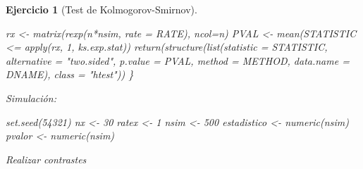 \documentclass[
  10pt,
]{book}
\newenvironment{Shaded}{\begin{snugshade}}{\end{snugshade}}
\newcommand{\AttributeTok}[1]{\textcolor[rgb]{0.77,0.63,0.00}{#1}}
\newcommand{\CommentTok}[1]{\textcolor[rgb]{0.56,0.35,0.01}{\textit{#1}}}
\newcommand{\ControlFlowTok}[1]{\textcolor[rgb]{0.13,0.29,0.53}{\textbf{#1}}}
\newcommand{\DecValTok}[1]{\textcolor[rgb]{0.00,0.00,0.81}{#1}}
\newcommand{\FunctionTok}[1]{\textcolor[rgb]{0.00,0.00,0.00}{#1}}
\newcommand{\NormalTok}[1]{#1}
\newcommand{\OtherTok}[1]{\textcolor[rgb]{0.56,0.35,0.01}{#1}}
\newcommand{\SpecialCharTok}[1]{\textcolor[rgb]{0.00,0.00,0.00}{#1}}
\newcommand{\StringTok}[1]{\textcolor[rgb]{0.31,0.60,0.02}{#1}}
\theoremstyle{break}
\newtheorem{exercise}{Ejercicio}[chapter]
\theoremstyle{nonumberplain}
\renewcommand{\CommentTok}[1]{\textcolor[rgb]{0.41,0.41,0.41}{\texttt{#1}}}
\begin{document}
\begin{exercise}[Test de Kolmogorov-Smirnov]
\begin{enumerate}
\begin{Shaded}
\begin{Highlighting}[]
\NormalTok{  rx }\OtherTok{\textless{}{-}} \FunctionTok{matrix}\NormalTok{(}\FunctionTok{rexp}\NormalTok{(n}\SpecialCharTok{*}\NormalTok{nsim, }\AttributeTok{rate =}\NormalTok{ RATE), }\AttributeTok{ncol=}\NormalTok{n)}
\NormalTok{  PVAL }\OtherTok{\textless{}{-}} \FunctionTok{mean}\NormalTok{(STATISTIC }\SpecialCharTok{\textless{}=} \FunctionTok{apply}\NormalTok{(rx, }\DecValTok{1}\NormalTok{, ks.exp.stat))}
  \FunctionTok{return}\NormalTok{(}\FunctionTok{structure}\NormalTok{(}\FunctionTok{list}\NormalTok{(}\AttributeTok{statistic =}\NormalTok{ STATISTIC, }\AttributeTok{alternative =} \StringTok{"two.sided"}\NormalTok{, }
                   \AttributeTok{p.value =}\NormalTok{ PVAL, }\AttributeTok{method =}\NormalTok{ METHOD, }\AttributeTok{data.name =}\NormalTok{ DNAME), }
                   \AttributeTok{class =} \StringTok{"htest"}\NormalTok{))}
\NormalTok{\}}
\end{Highlighting}
\end{Shaded}

  Simulación:

\begin{Shaded}
\begin{Highlighting}[]
\FunctionTok{set.seed}\NormalTok{(}\DecValTok{54321}\NormalTok{)}
\NormalTok{nx }\OtherTok{\textless{}{-}} \DecValTok{30}
\NormalTok{ratex }\OtherTok{\textless{}{-}} \DecValTok{1}
\NormalTok{nsim }\OtherTok{\textless{}{-}} \DecValTok{500}
\NormalTok{estadistico }\OtherTok{\textless{}{-}} \FunctionTok{numeric}\NormalTok{(nsim)}
\NormalTok{pvalor }\OtherTok{\textless{}{-}} \FunctionTok{numeric}\NormalTok{(nsim)}
\end{Highlighting}
\end{Shaded}

  Realizar contrastes

\begin{Shaded}
\end{Shaded}


\end{enumerate}
\end{exercise}
\end{document}
